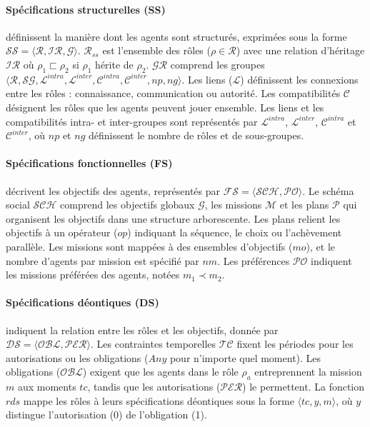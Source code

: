 \noindent \paragraph{\textbf{Spécifications structurelles (SS)}} définissent la manière dont les agents sont structurés, exprimées sous la forme $\mathcal{SS} = \langle \mathcal{R}, \mathcal{IR}, \mathcal{G} \rangle$. $\mathcal{R}_{ss}$ est l'ensemble des rôles ($\rho \in \mathcal{R}$) avec une relation d'héritage $\mathcal{IR}$ où $\rho_1 \sqsubset \rho_2$ si $\rho_1$ hérite de $\rho_2$. $\mathcal{GR}$ comprend les groupes $\langle \mathcal{R}, \mathcal{SG}, \mathcal{L}^{intra}, \mathcal{L}^{inter}, \allowbreak \mathcal{C}^{intra}, \mathcal{C}^{inter}, np, ng \rangle$. Les liens ($\mathcal{L}$) définissent les connexions entre les rôles : connaissance, communication ou autorité. Les compatibilités $\mathcal{C}$ désignent les rôles que les agents peuvent jouer ensemble. Les liens et les compatibilités intra- et inter-groupes sont représentés par $\mathcal{L}^{intra}$, $\mathcal{L}^{inter}$, $\mathcal{C}^{intra}$ et $\mathcal{C}^{inter}$, où $np$ et $ng$ définissent le nombre de rôles et de sous-groupes.

\noindent \paragraph{\textbf{Spécifications fonctionnelles (FS)}} décrivent les objectifs des agents, représentés par $\mathcal{FS} = \langle \mathcal{SCH}, \mathcal{PO} \rangle$. Le schéma social $\mathcal{SCH}$ comprend les objectifs globaux $\mathcal{G}$, les missions $\mathcal{M}$ et les plans $\mathcal{P}$ qui organisent les objectifs dans une structure arborescente. Les plans relient les objectifs à un opérateur ($op$) indiquant la séquence, le choix ou l'achèvement parallèle. Les missions sont mappées à des ensembles d'objectifs ($mo$), et le nombre d'agents par mission est spécifié par $nm$. Les préférences $\mathcal{PO}$ indiquent les missions préférées des agents, notées $m_1 \prec m_2$.

\noindent \paragraph{\textbf{Spécifications déontiques (DS)}} indiquent la relation entre les rôles et les objectifs, donnée par $\mathcal{DS} = \langle \mathcal{OBL}, \mathcal{PER} \rangle$. Les contraintes temporelles $\mathcal{TC}$ fixent les périodes pour les autorisations ou les obligations ($Any$ pour n'importe quel moment). Les obligations ($\mathcal{OBL}$) exigent que les agents dans le rôle $\rho_a$ entreprennent la mission $m$ aux moments $tc$, tandis que les autorisations ($\mathcal{PER}$) le permettent. La fonction $rds$ mappe les rôles à leurs spécifications déontiques sous la forme $\langle tc, y, m \rangle$, où $y$ distingue l'autorisation (0) de l'obligation (1).

